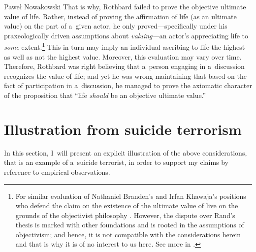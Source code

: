 \begin{artengenv}{Paweł Nowakowski}
That is why, Rothbard failed to prove the objective ultimate value of life. Rather, instead of proving the affirmation of life (as an ultimate value) on the part of a~given actor, he only proved---specifically under his praxeologically driven assumptions about \textit{valuing---}an actor's appreciating life to \textit{some} extent.\footnote{For similar evaluation of Nathaniel Branden's and Irfan Khawaja's positions who defend the claim on the existence of the ultimate value of live on the grounds of the objectivist philosophy 
\parencite[see][pp.97–98]{Moen2012Is}. %
 However, the dispute over Rand's thesis is marked with other foundations and is rooted in the assumptions of objectivism; and hence, it is not compatible with the considerations herein and that is why it is of no interest to us here. See more in 
\parencites[][]{Nozick1971On}[][pp.69–86]{Rasmussen2002Rand}[][pp.54–67]{Hartford2017Ultimate}.%
} This in turn may imply an individual ascribing to life the highest as well as not the highest value. Moreover, this evaluation may vary over time. Therefore, Rothbard was right believing that a~person engaging in a~discussion recognizes the value of life; and yet he was wrong maintaining that based on the fact of participation in a~discussion, he managed to prove the axiomatic character of the proposition that ``life \textit{should} be an objective ultimate value.''



\section{Illustration from suicide terrorism}

In this section, I~will present an explicit illustration of the above considerations, that is an example of a~suicide terrorist, in order to support my claims by reference to empirical observations.




\end{artengenv}
